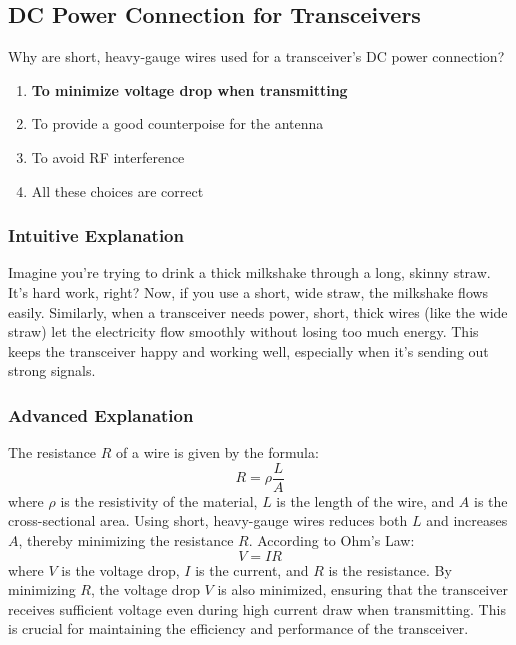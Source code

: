 \subsection{DC Power Connection for Transceivers}
\label{T4A03}

\begin{tcolorbox}[colback=gray!10!white,colframe=black!75!black,title=T4A03]
Why are short, heavy-gauge wires used for a transceiver’s DC power connection?
\begin{enumerate}[label=\Alph*)]
    \item \textbf{To minimize voltage drop when transmitting}
    \item To provide a good counterpoise for the antenna
    \item To avoid RF interference
    \item All these choices are correct
\end{enumerate}
\end{tcolorbox}

\subsubsection{Intuitive Explanation}
Imagine you’re trying to drink a thick milkshake through a long, skinny straw. It’s hard work, right? Now, if you use a short, wide straw, the milkshake flows easily. Similarly, when a transceiver needs power, short, thick wires (like the wide straw) let the electricity flow smoothly without losing too much energy. This keeps the transceiver happy and working well, especially when it’s sending out strong signals.

\subsubsection{Advanced Explanation}
The resistance \( R \) of a wire is given by the formula:
\[
R = \rho \frac{L}{A}
\]
where \( \rho \) is the resistivity of the material, \( L \) is the length of the wire, and \( A \) is the cross-sectional area. Using short, heavy-gauge wires reduces both \( L \) and increases \( A \), thereby minimizing the resistance \( R \). According to Ohm’s Law:
\[
V = IR
\]
where \( V \) is the voltage drop, \( I \) is the current, and \( R \) is the resistance. By minimizing \( R \), the voltage drop \( V \) is also minimized, ensuring that the transceiver receives sufficient voltage even during high current draw when transmitting. This is crucial for maintaining the efficiency and performance of the transceiver.

